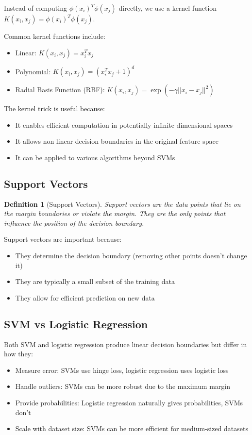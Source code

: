 \documentclass{article}
\newtheorem{definition}{Definition}
\begin{document}
Instead of computing $\phi(x_i)^T\phi(x_j)$ directly, we use a kernel function $K(x_i, x_j) = \phi(x_i)^T\phi(x_j)$.

Common kernel functions include:
\begin{itemize}
\item Linear: $K(x_i, x_j) = x_i^Tx_j$
\item Polynomial: $K(x_i, x_j) = (x_i^Tx_j + 1)^d$
\item Radial Basis Function (RBF): $K(x_i, x_j) = \exp(-\gamma||x_i - x_j||^2)$
\end{itemize}

The kernel trick is useful because:
\begin{itemize}
\item It enables efficient computation in potentially infinite-dimensional spaces
\item It allows non-linear decision boundaries in the original feature space
\item It can be applied to various algorithms beyond SVMs
\end{itemize}

\subsection{Support Vectors}
\begin{definition}[Support Vectors]
Support vectors are the data points that lie on the margin boundaries or violate the margin. They are the only points that influence the position of the decision boundary.
\end{definition}

Support vectors are important because:
\begin{itemize}
\item They determine the decision boundary (removing other points doesn't change it)
\item They are typically a small subset of the training data
\item They allow for efficient prediction on new data
\end{itemize}

\subsection{SVM vs Logistic Regression}
Both SVM and logistic regression produce linear decision boundaries but differ in how they:
\begin{itemize}
\item Measure error: SVMs use hinge loss, logistic regression uses logistic loss
\item Handle outliers: SVMs can be more robust due to the maximum margin
\item Provide probabilities: Logistic regression naturally gives probabilities, SVMs don't
\item Scale with dataset size: SVMs can be more efficient for medium-sized datasets
\end{itemize}
\end{document}
